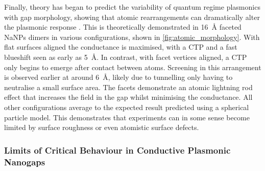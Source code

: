 \documentclass{article}
\begin{document}
Finally, theory has began to predict the variability of quantum regime plasmonics with gap morphology, showing that atomic rearrangements can dramatically alter the plasmonic response \cite{barbry2015}. This is theoretically demonstrated in \SI{16}{\angstrom} faceted NaNPs dimers in various configurations, shown in \autoref{fig:atomic_morphology}. With flat surfaces aligned the conductance is maximised, with a CTP and a fast blueshift seen as early as \SI{5}{\angstrom}. In contrast, with facet vertices aligned, a CTP only begins to emerge after contact between atoms. Screening in this arrangement is observed earlier at around \SI{6}{\angstrom}, likely due to tunnelling only having to neutralise a small surface area. The facets demonstrate an atomic lightning rod effect that increases the field in the gap whilst minimising the conductance. All other configurations average to the expected result predicted using a spherical particle model. This demonstrates that experiments can in some sense become limited by surface roughness or even atomistic surface defects.


\subsubsection{Limits of Critical Behaviour in Conductive Plasmonic Nanogaps}
\end{document}
